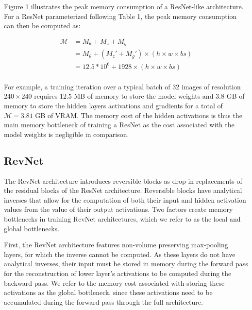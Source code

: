 \documentclass[twocolumn]{bmcart}
\begin{document}
Figure 1 illustrates the peak memory consumption of a ResNet-like architecture.
For a ResNet parameterized following Table 1, the peak memory consumption can then be computed as:

\begin{subequations}
\begin{align}
\mathcal{M} &= M_{\theta} + M_{z} + M_{g} \\
            &= M_{\theta} + (M_{z}' + M_{g}') \times (h \times w \times bs) \\
            &= 12.5*10^6 + 1928 \times (h \times w \times bs) \\
\end{align}
\end{subequations}

For example, a training iteration over a typical batch of 32 images of resolution $240 \times 240$
requires 12.5 MB of memory to store the model weights and 3.8 GB of memory to store the hidden layers activations and gradients
for a total of $\mathcal{M}=3.81$ GB of VRAM.
The memory cost of the hidden activations is thus the main memory bottleneck of training a ResNet as the cost associated with
the model weights is negligible in comparison.

\subsection{RevNet}
The RevNet architecture introduces reversible blocks as drop-in replacements of the residual blocks of the ResNet architecture.
Reversible blocks have analytical inverses that allow for the computation of both their input and hidden activation values from the value of their output activations.
Two factors create memory bottlenecks in training RevNet architectures, which we refer to as the local and global bottlenecks.

First, the RevNet architecture features non-volume preserving max-pooling layers, for which the inverse cannot be computed.
As these layers do not have analytical inverses, their input must be stored in memory during the forward pass
for the reconstruction of lower layer's activations to be computed during the backward pass.
We refer to the memory cost associated with storing these activations as the global bottleneck,
since these activations need to be accumulated during the forward pass through the full architecture.
\end{document}
